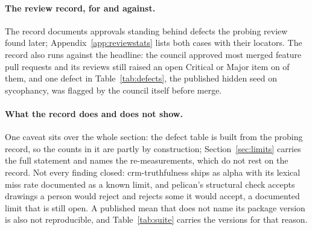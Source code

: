 \paragraph{The review record, for and against.}
The record documents \approvalDefectCases{} approvals standing behind defects the probing review found later; Appendix~\ref{app:reviewstats} lists both cases with their locators. The record also runs against the headline: the council approved most merged feature pull requests and its reviews still raised an open Critical or Major item on \councilSeverityFeaturePrs{} of them, and one defect in Table~\ref{tab:defects}, the published hidden seed on sycophancy, was flagged by the council itself before merge.

\paragraph{What the record does and does not show.}
One caveat sits over the whole section: the defect table is built from the probing record, so the counts in it are partly by construction; Section~\ref{sec:limits} carries the full statement and names the re-measurements, which do not rest on the record. Not every finding closed: crm-truthfulness ships as alpha with its lexical miss rate documented as a known limit, and pelican's structural check accepts drawings a person would reject and rejects some it would accept, a documented limit that is still open. A published mean that does not name its package version is also not reproducible, and Table~\ref{tab:suite} carries the versions for that reason.
